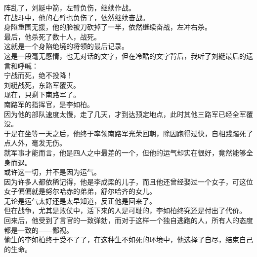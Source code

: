 \begin{multicols}{\theparacolNo}
阵乱了，刘綎中箭，左臂负伤，继续作战。\\

在战斗中，他的右臂也负伤了，依然继续奋战。\\

身陷重围无援，他的脸被刀砍掉了一半，依然继续奋战，左冲右杀。\\

最后，他杀死了数十人，战死。\\

这就是一个身陷绝境的将领的最后记录。\\

这是一段毫无感情，也无对话的文字，但在冷酷的文字背后，我听了刘綎最后的遗言和呼喊：\\

宁战而死，绝不投降！\\

刘綎战死，东路军覆灭。\\

现在，只剩下南路军了。\\

南路军的指挥官，是李如柏。\\

因为他的部队速度太慢，走了几天，才到达预定地点，此时其他三路军已经全军覆没。\\

于是在坐等一天之后，他终于率领南路军光荣回朝，除因跑得过快，自相践踏死了点人外，毫发无伤。\\

就军事才能而言，他是四人之中最差的一个，但他的运气却实在很好，竟然能够全身而退。\\

或许这一切，并不是因为运气。\\

因为许多人都依稀记得，他是李成梁的儿子，而且他还曾经娶过一个女子，可这位女子偏偏就是努尔哈赤的弟弟，舒尔哈齐的女儿。\\

无论是运气太好还是太早知道，反正他是回来了。\\

但在战争，尤其是败仗中，活下来的人是可耻的，李如柏终究还是付出了代价。\\

回来后，他受到了言官的一致弹劾，而对于这样一个独自逃跑的人，所有人的态度都是一致的——鄙视。\\

偷生的李如柏终于受不了了，在这种生不如死的环境中，他选择了自尽，结束自己的生命。\\


\end{multicols}

